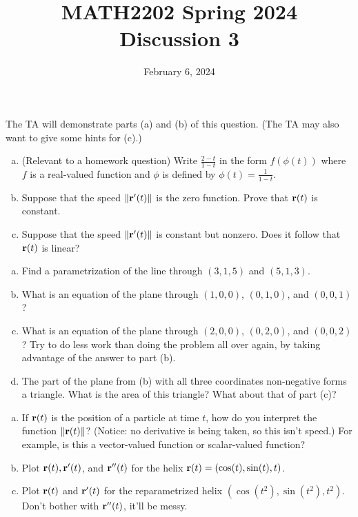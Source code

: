 \documentclass[11pt,oneside]{amsart}
\title{MATH2202 Spring 2024\\
Discussion 3}
\date{February 6, 2024}
\theoremstyle{definition}
\begin{document}
  \maketitle

  \begin{problem}
    The TA will demonstrate parts (a) and (b) of this question. (The TA may also want to give some hints for (c).)
    \begin{enumerate}[(a)]
        \item (Relevant to a homework question) Write $\frac{2-t}{1-t}$ in the form $f(\phi(t))$ where $f$ is a real-valued function and $\phi$ is defined by $\phi(t)=\frac1{1-t}$.
        \item Suppose that the speed $\|\mathbf r'(t)\|$ is the zero function. Prove that $\mathbf r(t)$ is constant.
        \item Suppose that the speed $\|\mathbf r'(t)\|$ is constant but nonzero. Does it follow that $\mathbf r(t)$ is linear?
    \end{enumerate}
  \end{problem}

  \begin{problem}
      \leavevmode\begin{enumerate}[(a)]
          \item Find a parametrization of the line through $(3,1,5)$ and $(5,1,3)$.
          \item What is an equation of the plane through $(1,0,0)$, $(0,1,0)$, and $(0,0,1)$?
          \item What is an equation of the plane through $(2,0,0)$, $(0,2,0)$, and $(0,0,2)$? Try to do less work than doing the problem all over again, by taking advantage of the answer to part (b).
          \item The part of the plane from (b) with all three coordinates non-negative forms a triangle. What is the area of this triangle? What about that of part (c)?
      \end{enumerate}
  \end{problem}

  \begin{problem}
    \leavevmode\begin{enumerate}[(a)]
        \item If $\mathbf r(t)$ is the position of a particle at time $t$, how do you interpret the function $\|\mathbf r(t)\|$? (Notice: no derivative is being taken, so this isn't speed.) For example, is this a vector-valued function or scalar-valued function?
        \item Plot $\mathbf r(t),\mathbf r'(t)$, and $\mathbf r''(t)$ for the helix $\mathbf r(t)=(\cos(t),\sin(t),t)$.
        \item Plot $\mathbf r(t)$ and $\mathbf r'(t)$ for the reparametrized helix $(\cos(t^2),\sin(t^2),t^2)$. Don't bother with $\mathbf r''(t)$, it'll be messy.
    \end{enumerate}
  \end{problem}
\end{document}
